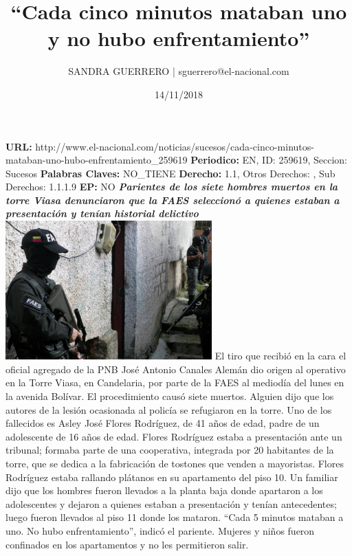 \documentclass{article}%
\title{\textbf{“Cada cinco minutos mataban uno y no hubo enfrentamiento”}}%
\author{SANDRA GUERRERO | sguerrero@el{-}nacional.com}%
\date{14/11/2018}%
\begin{document}
%
\normalsize%
\maketitle%
\textbf{URL: }%
http://www.el{-}nacional.com/noticias/sucesos/cada{-}cinco{-}minutos{-}mataban{-}uno{-}hubo{-}enfrentamiento\_259619\newline%
%
\textbf{Periodico: }%
EN, %
ID: %
259619, %
Seccion: %
Sucesos\newline%
%
\textbf{Palabras Claves: }%
NO\_TIENE\newline%
%
\textbf{Derecho: }%
1.1, %
Otros Derechos: %
, %
Sub Derechos: %
1.1.1.9\newline%
%
\textbf{EP: }%
NO\newline%
\newline%
%
\textbf{\textit{Parientes de los siete hombres muertos en la torre Viasa denunciaron que la FAES seleccionó a quienes estaban a presentación y tenían historial delictivo}}%
\newline%
\newline%
%
\includegraphics[width=300px]{120.jpg}%
\newline%
%
El tiro que recibió en la cara el oficial agregado de la PNB José Antonio Canales Alemán dio origen al operativo en la Torre Viasa, en Candelaria, por parte de la FAES al mediodía del lunes en la avenida Bolívar. El procedimiento causó siete muertos. Alguien dijo que los autores de la lesión ocasionada al policía se refugiaron en la torre.%
\newline%
%
Uno de los fallecidos es Asley José Flores Rodríguez, de 41 años de edad, padre de un adolescente de 16 años de edad. Flores Rodríguez estaba a presentación ante un tribunal; formaba parte de una cooperativa, integrada por 20 habitantes de la torre, que se dedica a la fabricación de tostones que venden a mayoristas.%
\newline%
%
Flores Rodríguez estaba rallando plátanos en su apartamento del piso 10. Un familiar dijo que los hombres fueron llevados a la planta baja donde apartaron a los adolescentes y dejaron a quienes estaban a presentación y tenían antecedentes; luego fueron llevados al piso 11 donde los mataron. “Cada 5 minutos mataban a uno. No hubo enfrentamiento”, indicó el pariente. Mujeres y niños fueron confinados en los apartamentos y no les permitieron salir.%
\end{document}
